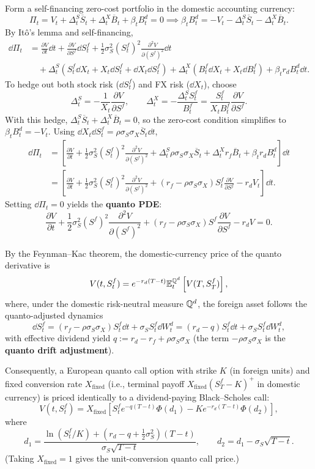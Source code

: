 Form a self-financing zero-cost portfolio in the domestic accounting currency:
\[
\Pi_t = V_t + \Delta_t^S \overline{S}_t + \Delta_t^X \overline{B}_t + \beta_t B_t^d = 0 \implies \beta_t B_t^d = -V_t - \Delta_t^S \overline{S}_t - \Delta_t^X \overline{B}_t.
\]
By It\^{o}'s lemma and self-financing,
\[
\begin{aligned}
    \dd\Pi_t &= \frac{\partial V}{\partial t}\dd t + \frac{\partial V}{\partial S^f}\dd S_t^f + \frac{1}{2}\sigma_S^2 (S_t^f)^2 \frac{\partial^2 V}{\partial (S^f)^2}\dd t \\
             &\quad + \Delta_t^S\left(S_t^f \dd X_t + X_t \dd S_t^f + \dd X_t \dd S_t^f\right) + \Delta_t^X\left(B_t^f \dd X_t + X_t \dd B_t^f\right) + \beta_t r_d B_t^d \dd t.
\end{aligned}
\]
To hedge out both stock risk ($\dd S_t^f$) and FX risk ($\dd X_t$), choose
\[
\Delta_t^S = -\frac{1}{X_t}\frac{\partial V}{\partial S^f}, \qquad \Delta_t^X = -\frac{\Delta_t^S S_t^f}{B_t^f} = \frac{S_t^f}{X_t B_t^f}\frac{\partial V}{\partial S^f}.
\]
With this hedge, $\Delta_t^S \overline{S}_t + \Delta_t^X \overline{B}_t = 0$, so the zero-cost condition simplifies to $\beta_t B_t^d = -V_t$. Using $\dd X_t \dd S_t^f = \rho\sigma_S\sigma_X \overline{S}_t \dd t$,
\[
\begin{aligned}
    \dd\Pi_t &= \left[\frac{\partial V}{\partial t} + \frac{1}{2}\sigma_S^2 (S_t^f)^2 \frac{\partial^2 V}{\partial (S^f)^2} + \Delta_t^S \rho\sigma_S\sigma_X \overline{S}_t + \Delta_t^X r_f \overline{B}_t + \beta_t r_d B_t^d\right]\dd t \\
             &= \left[\frac{\partial V}{\partial t} + \frac{1}{2}\sigma_S^2 (S_t^f)^2 \frac{\partial^2 V}{\partial (S^f)^2} + (r_f - \rho\sigma_S\sigma_X)S_t^f \frac{\partial V}{\partial S^f} - r_d V_t\right]\dd t.
\end{aligned}
\]
Setting $\dd\Pi_t = 0$ yields the \textbf{quanto PDE}:
\[
\frac{\partial V}{\partial t} + \frac{1}{2}\sigma_S^2 (S^f)^2 \frac{\partial^2 V}{\partial (S^f)^2} + (r_f - \rho\sigma_S\sigma_X)S^f \frac{\partial V}{\partial S^f} - r_d V = 0.
\]

By the Feynman--Kac theorem, the domestic-currency price of the quanto derivative is
\[
V(t, S_t^f) = e^{-r_d(T-t)}\mathbb{E}_t^{\mathbb{Q}^d}\left[V(T, S_T^f)\right],
\]
where, under the domestic risk-neutral measure $\mathbb{Q}^d$, the foreign asset follows the quanto-adjusted dynamics
\[
\dd S_t^f = (r_f - \rho\sigma_S\sigma_X)S_t^f \dd t + \sigma_S S_t^f \dd W_t^d = (r_d - q)S_t^f \dd t + \sigma_S S_t^f \dd W_t^d,
\]
with effective dividend yield $q := r_d - r_f + \rho\sigma_S\sigma_X$ (the term $-\rho\sigma_S\sigma_X$ is the \textbf{quanto drift adjustment}).

Consequently, a European quanto call option with strike $K$ (in foreign units) and fixed conversion rate $X_{\text{fixed}}$ (i.e., terminal payoff $X_{\text{fixed}}(S_T^f - K)^+$ in domestic currency) is priced identically to a dividend-paying Black--Scholes call:
\[
V(t, S_t^f) = X_{\text{fixed}}\left[S_t^f e^{-q(T-t)}\Phi(d_1) - K e^{-r_d(T-t)}\Phi(d_2)\right],
\]
where
\[
d_1 = \frac{\ln(S_t^f/K) + \left(r_d - q + \frac{1}{2}\sigma_S^2\right)(T - t)}{\sigma_S\sqrt{T - t}}, \qquad d_2 = d_1 - \sigma_S\sqrt{T - t}.
\]
(Taking $X_{\text{fixed}} = 1$ gives the unit-conversion quanto call price.)
